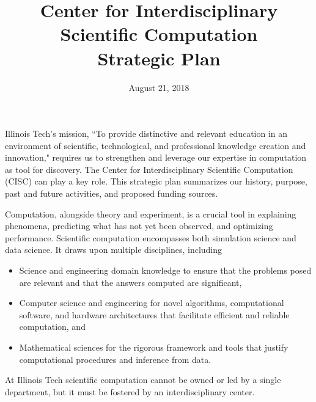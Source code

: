 \documentclass[12pt]{amsart}
\begin{document}
\title[Center for Interdisciplinary Scientific Computation Strategic Plan]{Center for Interdisciplinary Scientific Computation \\ Strategic Plan}
\date{August 21, 2018}
\maketitle


Illinois Tech's mission, ``To provide distinctive and relevant education in an environment of scientific, technological, and professional knowledge creation and innovation," requires us to strengthen and leverage our expertise in computation as tool for discovery.  The Center for Interdisciplinary Scientific Computation (CISC) can play a key role. This strategic plan  summarizes our history, purpose, past and future activities, and proposed funding sources.

Computation, alongside theory and experiment, is a crucial tool in explaining phenomena, predicting what has not yet been observed, and optimizing performance.  Scientific computation encompasses both simulation science and data science. It draws upon multiple disciplines, including
\begin{itemize}
    \item Science and engineering domain knowledge to ensure that the problems posed are relevant and that the answers computed are significant,
    \item Computer science and engineering for novel algorithms, computational software, and hardware architectures that facilitate efficient and reliable computation, and
    \item Mathematical sciences for the rigorous framework and tools that justify computational procedures and inference from data.
\end{itemize}
At Illinois Tech scientific computation cannot be owned or led by a single department, but it must be fostered by an interdisciplinary center.
\end{document}
